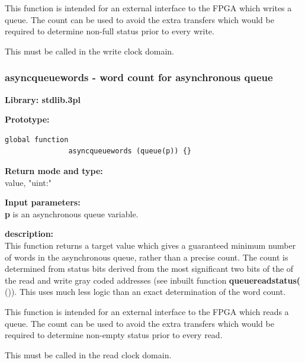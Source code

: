             This function is intended for an external interface to the FPGA
            which writes a queue. The count can be used to avoid the extra
            transfers which would be required to determine non-full status
            prior to every write.
            
            This must be called in the write clock domain.
             


        \subsubsection{asyncqueuewords - word count for asynchronous queue}\label{sec:lfasyncqueuewords}

            {\bf Library: stdlib.3pl}

            {\bf Prototype:} \\
            \vsp
            \begin{lstlisting}[gobble=12, language=threepl]
               global function
               asyncqueuewords (queue(p)) {}
            \end{lstlisting}

            {\bf Return mode and type:} \\
            value, "uint:"

            {\bf Input parameters:} \\            
            {\bf p} is an asynchronous queue variable.

            {\bf description:} \\
            This function returns a target value which gives a guaranteed
            minimum number of words in the asynchronous queue, rather than a
            precise count. The count is determined from status bits derived from
            the most significant two bits of the of the read and write gray
            coded addresses (see inbuilt function {\bf queuereadstatus(}
            ()). This uses much less logic than
            an exact determination of the word count.
            
            This function is intended for an external interface to the FPGA
            which reads a queue. The count can be used to avoid the extra
            transfers which would be required to determine non-empty status
            prior to every read.
            
            This must be called in the read clock domain.
           


